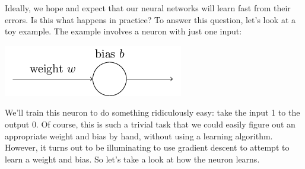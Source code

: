 \documentclass[a4paper,twoside,10pt]{book}
\begin{document}
Ideally, we hope and expect that our neural networks will learn fast from their errors. Is this what happens in practice? To answer this question, let's look at a toy example. The example involves a neuron with just one input:

\begin{center}
	\includegraphics[width=0.5\linewidth]{figures/ch3/tikz28}
\end{center}
We'll train this neuron to do something ridiculously easy: take the input 1 to the output 0. Of course, this is such a trivial task that we could easily figure out an appropriate weight and bias by hand, without using a learning algorithm. However, it turns out to be illuminating to use gradient descent to attempt to learn a weight and bias. So let's take a look at how the neuron learns.
\end{document}
